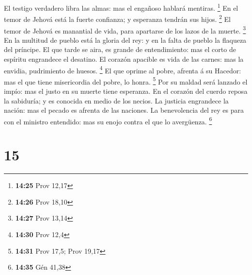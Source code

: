 El testigo verdadero libra las almas: mas el engañoso hablará mentiras.
\footnote{\textbf{14:25} Prov 12,17}  En el temor de Jehová
está la fuerte confianza; y esperanza tendrán sus hijos. \footnote{\textbf{14:26}
  Prov 18,10}  El temor de Jehová es manantial de vida,
para apartarse de los lazos de la muerte. \footnote{\textbf{14:27} Prov
  13,14}  En la multitud de pueblo está la gloria del rey:
y en la falta de pueblo la flaqueza del príncipe.  El que
tarde se aira, es grande de entendimiento: mas el corto de espíritu
engrandece el desatino.  El corazón apacible es vida de las
carnes: mas la envidia, pudrimiento de huesos. \footnote{\textbf{14:30}
  Prov 12,4}  El que oprime al pobre, afrenta á su Hacedor:
mas el que tiene misericordia del pobre, lo honra. \footnote{\textbf{14:31}
  Prov 17,5; Prov 19,17}  Por su maldad será lanzado el
impío: mas el justo en su muerte tiene esperanza.  En el
corazón del cuerdo reposa la sabiduría; y es conocida en medio de los
necios.  La justicia engrandece la nación: mas el pecado es
afrenta de las naciones.  La benevolencia del rey es para
con el ministro entendido: mas su enojo contra el que lo avergüenza.
\footnote{\textbf{14:35} Gén 41,38}

\hypertarget{section-14}{%
\section{15}\label{section-14}}

